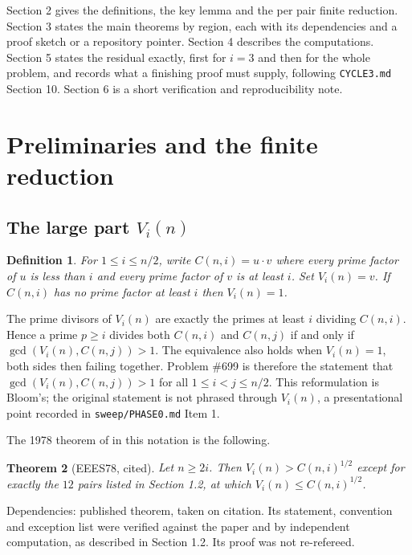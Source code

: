 \documentclass[11pt]{article}
\newtheorem{theorem}{Theorem}[section]
\newtheorem{definition}[theorem]{Definition}
\theoremstyle{remark}
\begin{document}
Section 2 gives the definitions, the key lemma and the per pair finite reduction. Section 3 states the main theorems by region, each with its dependencies and a proof sketch or a repository pointer. Section 4 describes the computations. Section 5 states the residual exactly, first for $i=3$ and then for the whole problem, and records what a finishing proof must supply, following \texttt{CYCLE3.md} Section 10. Section 6 is a short verification and reproducibility note.


\section{Preliminaries and the finite reduction}

\subsection{The large part $V_i(n)$}

\begin{definition}
For $1\le i\le n/2$, write $C(n,i)=u\cdot v$ where every prime factor of $u$ is less than $i$ and every prime factor of $v$ is at least $i$. Set $V_i(n)=v$. If $C(n,i)$ has no prime factor at least $i$ then $V_i(n)=1$.
\end{definition}

The prime divisors of $V_i(n)$ are exactly the primes at least $i$ dividing $C(n,i)$. Hence a prime $p\ge i$ divides both $C(n,i)$ and $C(n,j)$ if and only if $\gcd(V_i(n),C(n,j))>1$. The equivalence also holds when $V_i(n)=1$, both sides then failing together. Problem \#699 is therefore the statement that $\gcd(V_i(n),C(n,j))>1$ for all $1\le i<j\le n/2$. This reformulation is Bloom's; the original statement is not phrased through $V_i(n)$, a presentational point recorded in \texttt{sweep/PHASE0.md} Item 1.

The 1978 theorem of \cite{EEES78} in this notation is the following.

\begin{theorem}[EEES78, cited]
\label{thm:eees}
Let $n\ge 2i$. Then $V_i(n)>C(n,i)^{1/2}$ except for exactly the $12$ pairs listed in Section 1.2, at which $V_i(n)\le C(n,i)^{1/2}$.
\end{theorem}

Dependencies: published theorem, taken on citation. Its statement, convention and exception list were verified against the paper and by independent computation, as described in Section 1.2. Its proof was not re-refereed.
\end{document}
